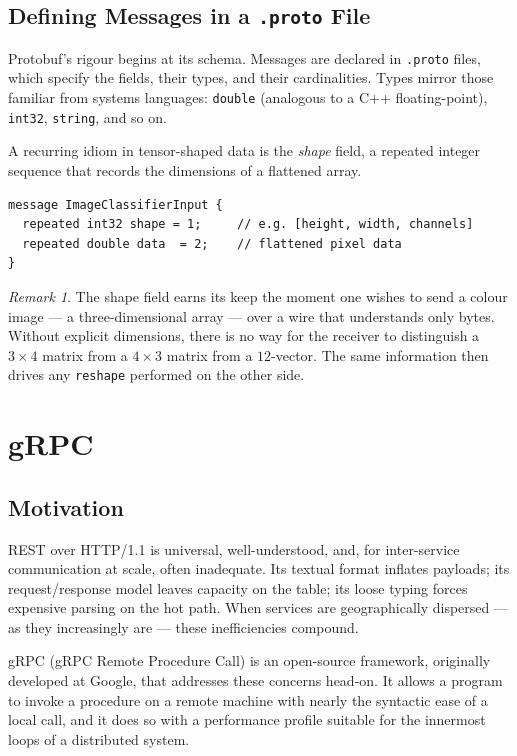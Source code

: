 \documentclass[11pt,a4paper]{article}
\theoremstyle{definition}
\theoremstyle{remark}
\newtheorem*{remark}{Remark}
\begin{document}
\subsection{Defining Messages in a \texttt{.proto} File}

Protobuf's rigour begins at its schema. Messages are declared in \texttt{.proto} files, which specify the fields, their types, and their cardinalities. Types mirror those familiar from systems languages: \texttt{double} (analogous to a C++ floating-point), \texttt{int32}, \texttt{string}, and so on.

A recurring idiom in tensor-shaped data is the \emph{shape} field, a repeated integer sequence that records the dimensions of a flattened array.

\begin{lstlisting}
message ImageClassifierInput {
  repeated int32 shape = 1;     // e.g. [height, width, channels]
  repeated double data  = 2;    // flattened pixel data
}
\end{lstlisting}

\begin{remark}
The shape field earns its keep the moment one wishes to send a colour image --- a three-dimensional array --- over a wire that understands only bytes. Without explicit dimensions, there is no way for the receiver to distinguish a $3\times 4$ matrix from a $4\times 3$ matrix from a $12$-vector. The same information then drives any \texttt{reshape} performed on the other side.
\end{remark}

\section{gRPC}


\subsection{Motivation}

REST over HTTP/1.1 is universal, well-understood, and, for inter-service communication at scale, often inadequate. Its textual format inflates payloads; its request/response model leaves capacity on the table; its loose typing forces expensive parsing on the hot path. When services are geographically dispersed --- as they increasingly are --- these inefficiencies compound.

gRPC (gRPC Remote Procedure Call) is an open-source framework, originally developed at Google, that addresses these concerns head-on. It allows a program to invoke a procedure on a remote machine with nearly the syntactic ease of a local call, and it does so with a performance profile suitable for the innermost loops of a distributed system.
\end{document}
